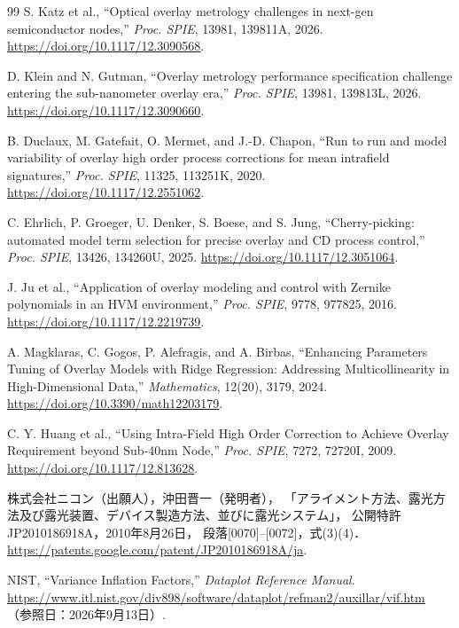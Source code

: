 \documentclass[11pt,a4paper]{ltjsarticle}
\begin{document}
{}
\begingroup
\small
\begin{thebibliography}{99}
S. Katz et al., ``Optical overlay metrology challenges in next-gen semiconductor nodes,''
\textit{Proc. SPIE}, 13981, 139811A, 2026.
\url{https://doi.org/10.1117/12.3090568}.

D. Klein and N. Gutman, ``Overlay metrology performance specification challenge entering the sub-nanometer overlay era,''
\textit{Proc. SPIE}, 13981, 139813L, 2026.
\url{https://doi.org/10.1117/12.3090660}.

B. Duclaux, M. Gatefait, O. Mermet, and J.-D. Chapon,
``Run to run and model variability of overlay high order process corrections for mean intrafield signatures,''
\textit{Proc. SPIE}, 11325, 113251K, 2020.
\url{https://doi.org/10.1117/12.2551062}.

C. Ehrlich, P. Groeger, U. Denker, S. Boese, and S. Jung,
``Cherry-picking: automated model term selection for precise overlay and CD process control,''
\textit{Proc. SPIE}, 13426, 134260U, 2025.
\url{https://doi.org/10.1117/12.3051064}.

J. Ju et al., ``Application of overlay modeling and control with Zernike polynomials in an HVM environment,''
\textit{Proc. SPIE}, 9778, 977825, 2016.
\url{https://doi.org/10.1117/12.2219739}.

A. Magklaras, C. Gogos, P. Alefragis, and A. Birbas,
``Enhancing Parameters Tuning of Overlay Models with Ridge Regression: Addressing Multicollinearity in High-Dimensional Data,''
\textit{Mathematics}, 12(20), 3179, 2024.
\url{https://doi.org/10.3390/math12203179}.

C. Y. Huang et al., ``Using Intra-Field High Order Correction to Achieve Overlay Requirement beyond Sub-40nm Node,''
\textit{Proc. SPIE}, 7272, 72720I, 2009.
\url{https://doi.org/10.1117/12.813628}.

株式会社ニコン（出願人），沖田晋一（発明者），
「アライメント方法、露光方法及び露光装置、デバイス製造方法、並びに露光システム」，
公開特許JP2010186918A，2010年8月26日，
段落[0070]--[0072]，式(3)(4)．
\url{https://patents.google.com/patent/JP2010186918A/ja}.

NIST, ``Variance Inflation Factors,'' \textit{Dataplot Reference Manual}.
\url{https://www.itl.nist.gov/div898/software/dataplot/refman2/auxillar/vif.htm}
（参照日：2026年9月13日）.


\end{thebibliography}
\end{document}
